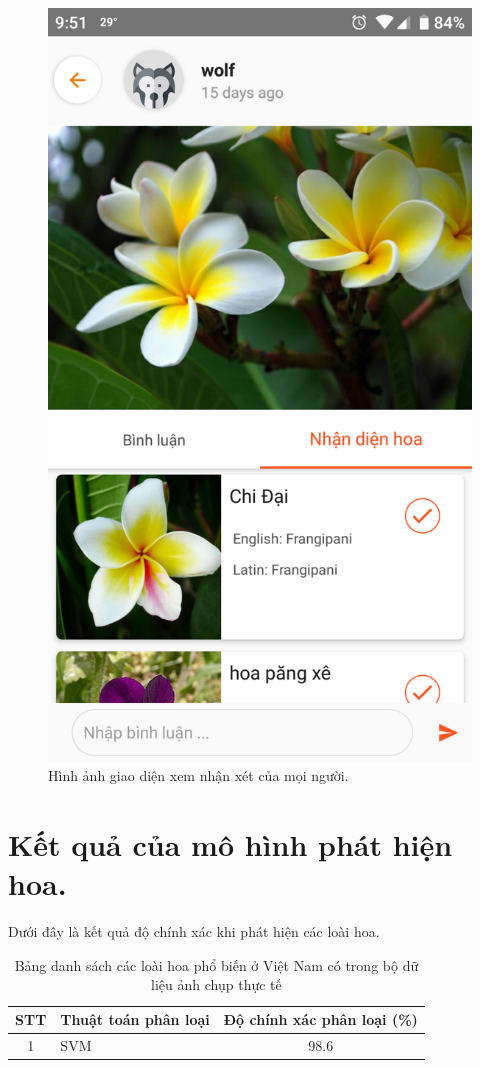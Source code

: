\documentclass[12pt]{report}
\begin{document}
\begin{figure}[h]
			\includegraphics[scale=0.2]{app_comment2}
			\caption{Hình ảnh giao diện xem nhận xét của mọi người.}
			\label{fig:app_comment}
		\end{figure}

		\newpage
		\section{Kết quả của mô hình phát hiện hoa.}
		Dưới đây là kết quả độ chính xác khi phát hiện các loài hoa.
		\begin{table}[h]
			\centering
			\caption{Bảng danh sách các loài hoa phổ biến ở Việt Nam có trong bộ dữ liệu ảnh chụp thực tế}
			\label{tbl:table ket qua cua Nilsback08}
			\begin{tabular}{|c|l|c|}
				\hline
				\textbf{STT} & \textbf{Thuật toán phân loại}& \textbf{Độ chính xác phân loại (\%)} \\ \hline
				1   & SVM & 98.6 \\ \hline   			
			\end{tabular}
		\end{table}
\end{document}
